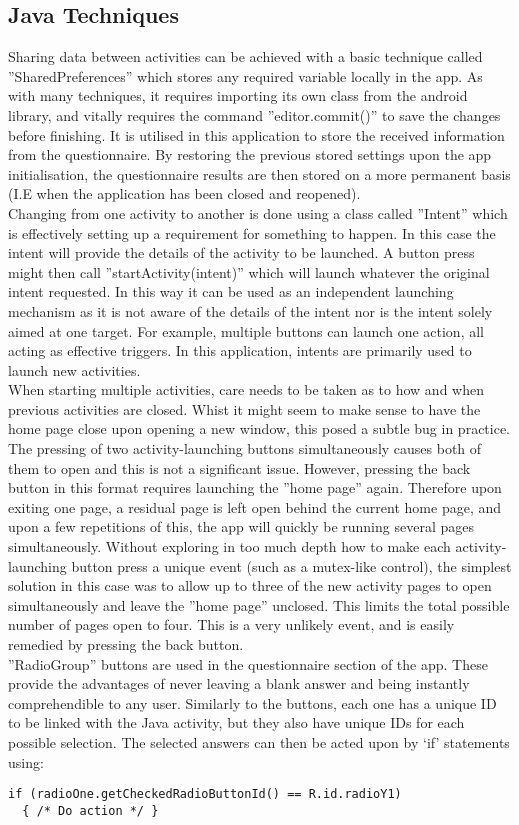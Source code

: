 \subsection{Java Techniques}
Sharing data between activities can be achieved with a basic technique called ''SharedPreferences'' which stores any required variable locally in the app. As with many techniques, it requires importing its own class from the android library, and vitally requires the command ''editor.commit()'' to save the changes before finishing. It is utilised in this application to store the received information from the questionnaire. By restoring the previous stored settings upon the app initialisation, the questionnaire results are then stored on a more permanent basis (I.E when the application has been closed and reopened).
\\ Changing from one activity to another is done using a class called ''Intent'' which is effectively setting up a requirement for something to happen. In this case the intent will provide the details of the activity to be launched. A button press might then call ''startActivity(intent)'' which will launch whatever the original intent requested. In this way it can be used as an independent launching mechanism as it is not aware of the details of the intent nor is the intent solely aimed at one target. For example, multiple buttons can launch one action, all acting as effective triggers. In this application, intents are primarily used to launch new activities.
\\ When starting multiple activities, care needs to be taken as to how and when previous activities are closed. Whist it might seem to make sense to have the home page close upon opening a new window, this posed a subtle bug in practice. The pressing of two activity-launching buttons simultaneously causes both of them to open and this is not a significant issue. However, pressing the back button in this format requires launching the ''home page'' again. Therefore upon exiting one page, a residual page is left open behind the current home page, and upon a few repetitions of this, the app will quickly be running several pages simultaneously. Without exploring in too much depth how to make each activity-launching button press a unique event (such as a mutex-like control), the simplest solution in this case was to allow up to three of the new activity pages to open simultaneously and leave the ''home page'' unclosed. This limits the total possible number of pages open to four. This is a very unlikely event, and is easily remedied by pressing the back button.
\\ ''RadioGroup'' buttons are used in the questionnaire section of the app. These provide the advantages of never leaving a blank answer and being instantly comprehendible to any user. Similarly to the buttons, each one has a unique ID to be linked with the Java activity, but they also have unique IDs for each possible selection. The selected answers can then be acted upon by ‘if’ statements using:
\begin{lstlisting}
if (radioOne.getCheckedRadioButtonId() == R.id.radioY1)
  { /* Do action */ } 
\end{lstlisting}
